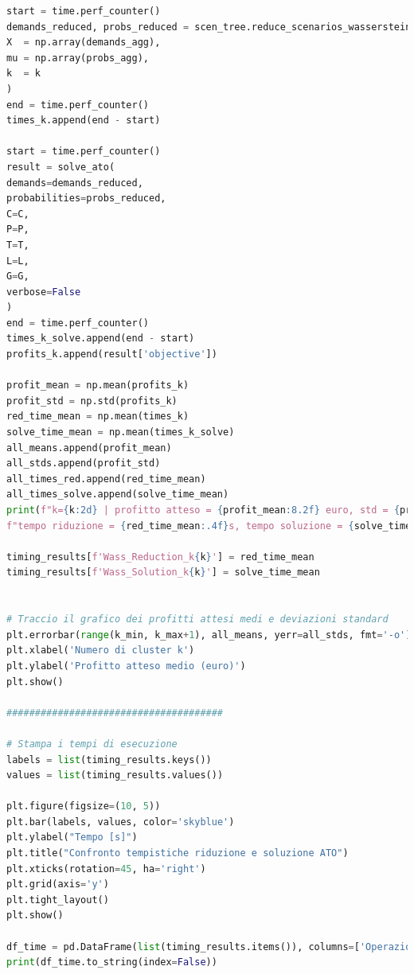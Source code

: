\documentclass[a4paper,12pt]{article}
\begin{document}
\begin{lstlisting}[language=python,caption={Main of ATO problem},label={lst:main-ato}]
start = time.perf_counter()
demands_reduced, probs_reduced = scen_tree.reduce_scenarios_wasserstein_multiD(
X  = np.array(demands_agg),
mu = np.array(probs_agg),
k  = k
)
end = time.perf_counter()
times_k.append(end - start)

start = time.perf_counter()
result = solve_ato(
demands=demands_reduced,
probabilities=probs_reduced,
C=C,
P=P,
T=T,
L=L,
G=G,
verbose=False
)
end = time.perf_counter()
times_k_solve.append(end - start)
profits_k.append(result['objective'])

profit_mean = np.mean(profits_k)
profit_std = np.std(profits_k)    
red_time_mean = np.mean(times_k)
solve_time_mean = np.mean(times_k_solve)
all_means.append(profit_mean)
all_stds.append(profit_std)
all_times_red.append(red_time_mean)
all_times_solve.append(solve_time_mean)
print(f"k={k:2d} | profitto atteso = {profit_mean:8.2f} euro, std = {profit_std:6.2f} euro, "
f"tempo riduzione = {red_time_mean:.4f}s, tempo soluzione = {solve_time_mean:.4f}s")

timing_results[f'Wass_Reduction_k{k}'] = red_time_mean
timing_results[f'Wass_Solution_k{k}'] = solve_time_mean


# Traccio il grafico dei profitti attesi medi e deviazioni standard
plt.errorbar(range(k_min, k_max+1), all_means, yerr=all_stds, fmt='-o')
plt.xlabel('Numero di cluster k')
plt.ylabel('Profitto atteso medio (euro)')
plt.show()

######################################

# Stampa i tempi di esecuzione
labels = list(timing_results.keys())
values = list(timing_results.values())

plt.figure(figsize=(10, 5))
plt.bar(labels, values, color='skyblue')
plt.ylabel("Tempo [s]")
plt.title("Confronto tempistiche riduzione e soluzione ATO")
plt.xticks(rotation=45, ha='right')
plt.grid(axis='y')
plt.tight_layout()
plt.show()

df_time = pd.DataFrame(list(timing_results.items()), columns=['Operazione', 'Tempo [s]'])
print(df_time.to_string(index=False))



\end{lstlisting}
\end{document}
